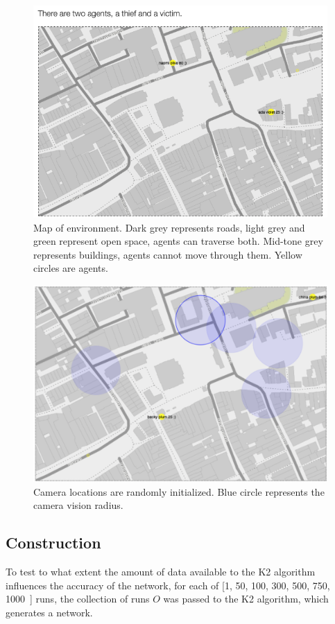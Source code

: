 \documentclass[12pt]{article}
\begin{document}
\begin{figure}[htbp]
\centering
\includegraphics[width=0.75\linewidth]{images/grotemarktmap.png}
\caption{Map of environment. Dark grey represents roads, light grey and green represent open space, agents can traverse both. Mid-tone grey represents buildings, agents cannot move through them. Yellow circles are agents.}
\label{groteMarkt1}
\end{figure}

\begin{figure}[htbp]
\centering
\includegraphics[width=0.75\linewidth]{images/agentGM.png}
\caption{Camera locations are randomly initialized. Blue circle represents the camera vision radius.}
\label{groteMarkt}
\end{figure}


\subsection{Construction}
To test to what extent the amount of data available to the K2 algorithm influences the accuracy of the network, for each of [1, 50, 100, 300, 500, 750, 1000~] runs, the collection of runs $O$ was passed to the K2 algorithm, which generates a network.
\end{document}
